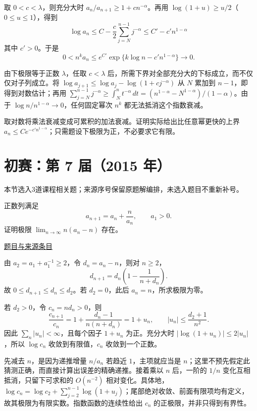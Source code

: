 \documentclass[12pt,fontset=fandol]{ctexart}
\begin{document}
\begin{solve}\label{ans:pre06-math:6}

取 $0<c<\lambda$，则充分大时 $a_n/a_{n+1}\ge1+cn^{-\alpha}$。再用 $\log(1+u)\ge u/2$（$0\le u\le1$），得到
\[
\log a_n\le C-\frac c2\sum_{j=N}^{n-1}j^{-\alpha}
\le C'-c'n^{1-\alpha}
\]
其中 $c'>0$。于是
\[
0<n^ka_n\le e^{C'}\exp\{k\log n-c'n^{1-\alpha}\}\longrightarrow0.
\]

由下极限等于正数 $\lambda$，任取 $c<\lambda$ 后，所需下界对全部充分大的下标成立，而不仅仅对子列成立。将 $\log a_{j+1}\le\log a_j-\log(1+cj^{-\alpha})$ 从 $N$ 累加到 $n-1$，即得到对数估计；再用 $\sum_{j=N}^{n-1}j^{-\alpha}\ge\int_N^n t^{-\alpha}\,dt=(n^{1-\alpha}-N^{1-\alpha})/(1-\alpha)$。由于 $\log n/n^{1-\alpha}\to0$，任何固定幂次 $n^k$ 都无法抵消这个指数衰减。

\end{solve}

\begin{remark}[方法与条件]取对数将乘法衰减变成可累积的加法衰减。证明实际给出比任意幂更快的上界 $a_n\le C e^{-c'n^{1-\alpha}}$；只需题设下极限为正，不必要求它有限。\end{remark}

\section{初赛：第 7 届（2015 年）}

本节选入3道课程相关题；来源序号保留原题解编排，未选入题目不重新补号。

\begin{example}[来源序号4]\label{ex:pre07-math:4}\label{pr:pre07-math:4}

正数列满足
\[
a_{n+1}=a_n+\frac n{a_n},\qquad a_1>0.
\]
证明极限 $\lim_{n\to\infty}n(a_n-n)$ 存在。

\par\href{https://github.com/lzxcr/cmc-mathematics/blob/64916fa1fdbc3e444a652eca204d5669058ee321/src/problems/preliminary/07/04.md}{题目与来源条目}

\end{example}

\begin{solve}\label{ans:pre07-math:4}

由 $a_2=a_1+a_1^{-1}\ge2$，令 $d_n=a_n-n$，则对 $n\ge2$，
\[
d_{n+1}=d_n\left(1-\frac1{n+d_n}\right).
\]
故 $0\le d_{n+1}\le d_n\le d_2$。若 $d_2=0$，此后 $a_n=n$，所求极限为零。

若 $d_2>0$，令 $c_n=nd_n>0$，则
\[
\frac{c_{n+1}}{c_n}
=1+\frac{d_n-1}{n(n+d_n)}=1+u_n,
\qquad |u_n|\le\frac{d_2+1}{n^2}.
\]
因此 $\sum_n|u_n|<\infty$，且每个因子 $1+u_n$ 为正。充分大时 $|\log(1+u_n)|\le2|u_n|$，所以 $\log c_n$ 收敛到有限值，$c_n$ 收敛到一个正数。

先减去 $n$，是因为递推增量 $n/a_n$ 若趋近 $1$，主项就应当是 $n$；这里不预先假定此猜测正确，而直接计算出误差的精确递推。接着乘以 $n$ 后，一阶的 $1/n$ 变化互相抵消，只留下可求和的 $O(n^{-2})$ 相对变化。具体地，$\log c_n=\log c_2+\sum_{j=2}^{n-1}\log(1+u_j)$；尾部绝对收敛、前面有限项均有定义，故其极限为有限实数。指数函数的连续性给出 $c_n$ 的正极限，并非只得到有界性。

\end{solve}
\end{document}
